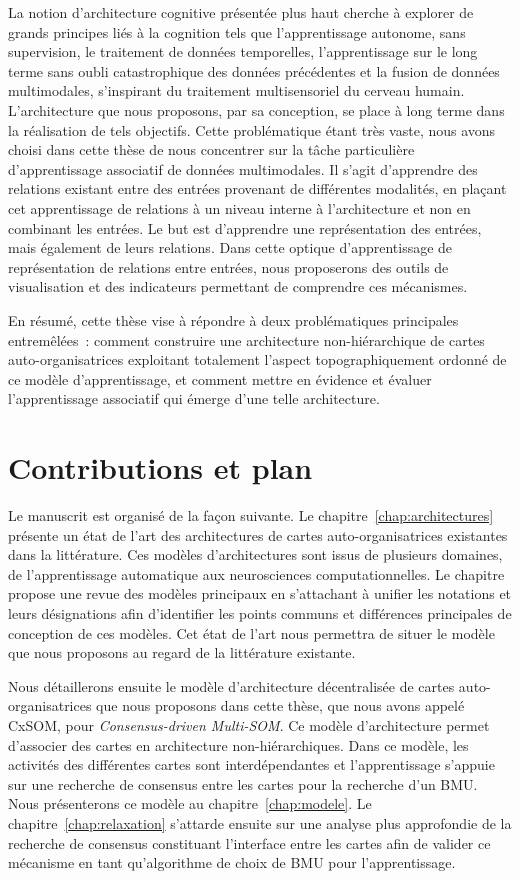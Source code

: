 La notion d'architecture cognitive présentée plus haut cherche à explorer de grands principes liés à la cognition tels que l'apprentissage autonome, sans supervision, le traitement de données temporelles, l'apprentissage sur le long terme sans oubli catastrophique des données précédentes et la fusion de données multimodales, s'inspirant du traitement multisensoriel du cerveau humain.
L'architecture que nous proposons, par sa conception, se place à long terme dans la réalisation de tels objectifs. Cette problématique étant très vaste, nous avons choisi dans cette thèse de nous concentrer sur la tâche particulière d'apprentissage associatif de données multimodales. 
Il s'agit d'apprendre des relations existant entre des entrées provenant de différentes modalités, en plaçant cet apprentissage de relations à un niveau interne à l'architecture et non en combinant les entrées. Le but est d'apprendre une représentation des entrées, mais également de leurs relations.
Dans cette optique d'apprentissage de représentation de relations entre entrées, nous proposerons des outils de visualisation et des indicateurs permettant de comprendre ces mécanismes.

En résumé, cette thèse vise à répondre à deux problématiques principales entremêlées~: comment construire une architecture non-hiérarchique de cartes auto-organisatrices exploitant totalement l'aspect topographiquement ordonné de ce modèle d'apprentissage, et comment mettre en évidence et évaluer l'apprentissage associatif qui émerge d'une telle architecture. 


\section*{Contributions et plan}

Le manuscrit est organisé de la façon suivante.
Le chapitre~\ref{chap:architectures} présente un état de l'art des architectures de cartes auto-organisatrices existantes dans la littérature. Ces modèles d'architectures sont issus de plusieurs domaines, de l'apprentissage automatique aux neurosciences computationnelles.
Le chapitre propose une revue des modèles principaux en s'attachant à unifier les notations et leurs désignations afin d'identifier les points communs et différences principales de conception de ces modèles.
Cet état de l'art nous permettra de situer le modèle que nous proposons au regard de la littérature existante.

Nous détaillerons ensuite le modèle d'architecture décentralisée de cartes auto-organisatrices que nous proposons dans cette thèse, que nous avons appelé CxSOM, pour \emph{Consensus-driven Multi-SOM}. 
Ce modèle d'architecture permet d'associer des cartes en architecture non-hiérarchiques. 
Dans ce modèle, les activités des différentes cartes sont interdépendantes et l'apprentissage s'appuie sur une recherche de consensus entre les cartes pour la recherche d'un BMU.
Nous présenterons ce modèle au chapitre~\ref{chap:modele}. Le chapitre~\ref{chap:relaxation} s'attarde ensuite sur une analyse plus approfondie de la recherche de consensus constituant l'interface entre les cartes afin de valider ce mécanisme en tant qu'algorithme de choix de BMU pour l'apprentissage.

